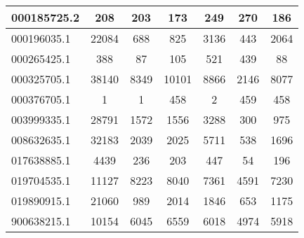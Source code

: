 \begin{adjustbox}{center}
\begin{tabular}{|l||c|c|c|c|c|c|}
\hline
000185725.2 & \cellcolor[RGB]{254, 250, 250} 208 & \cellcolor[RGB]{250, 250, 254} 203 & \cellcolor[RGB]{200, 200, 249} 173 & \cellcolor[RGB]{235, 71, 71} 249 & \cellcolor[RGB]{235, 71, 71} 270 & \cellcolor[RGB]{223, 223, 251} 186 \\
\hline
000196035.1 & \cellcolor[RGB]{235, 71, 71} 22084 & \cellcolor[RGB]{232, 232, 252} 688 & \cellcolor[RGB]{237, 237, 253} 825 & \cellcolor[RGB]{248, 195, 195} 3136 & \cellcolor[RGB]{223, 223, 251} 443 & \cellcolor[RGB]{252, 232, 232} 2064 \\
\hline
000265425.1 & \cellcolor[RGB]{252, 232, 232} 388 & \cellcolor[RGB]{232, 232, 252} 87 & \cellcolor[RGB]{232, 232, 252} 105 & \cellcolor[RGB]{250, 214, 214} 521 & \cellcolor[RGB]{251, 223, 223} 439 & \cellcolor[RGB]{232, 232, 252} 88 \\
\hline
000325705.1 & \cellcolor[RGB]{235, 71, 71} 38140 & \cellcolor[RGB]{241, 241, 253} 8349 & \cellcolor[RGB]{235, 71, 71} 10101 & \cellcolor[RGB]{253, 237, 237} 8866 & \cellcolor[RGB]{48, 48, 232} 2146 & \cellcolor[RGB]{227, 227, 252} 8077 \\
\hline
000376705.1 & \cellcolor[RGB]{232, 232, 252} 1 & \cellcolor[RGB]{232, 232, 252} 1 & \cellcolor[RGB]{252, 232, 232} 458 & \cellcolor[RGB]{232, 232, 252} 2 & \cellcolor[RGB]{252, 232, 232} 459 & \cellcolor[RGB]{252, 232, 232} 458 \\
\hline
003999335.1 & \cellcolor[RGB]{235, 71, 71} 28791 & \cellcolor[RGB]{255, 255, 255} 1572 & \cellcolor[RGB]{255, 255, 255} 1556 & \cellcolor[RGB]{235, 71, 71} 3288 & \cellcolor[RGB]{177, 177, 246} 300 & \cellcolor[RGB]{218, 218, 251} 975 \\
\hline
008632635.1 & \cellcolor[RGB]{235, 71, 71} 32183 & \cellcolor[RGB]{255, 255, 255} 2039 & \cellcolor[RGB]{255, 255, 255} 2025 & \cellcolor[RGB]{235, 71, 71} 5711 & \cellcolor[RGB]{48, 48, 232} 538 & \cellcolor[RGB]{218, 218, 251} 1696 \\
\hline
017638885.1 & \cellcolor[RGB]{235, 71, 71} 4439 & \cellcolor[RGB]{253, 237, 237} 236 & \cellcolor[RGB]{237, 237, 253} 203 & \cellcolor[RGB]{235, 71, 71} 447 & \cellcolor[RGB]{48, 48, 232} 54 & \cellcolor[RGB]{227, 227, 252} 196 \\
\hline
019704535.1 & \cellcolor[RGB]{235, 71, 71} 11127 & \cellcolor[RGB]{251, 223, 223} 8223 & \cellcolor[RGB]{253, 237, 237} 8040 & \cellcolor[RGB]{237, 237, 253} 7361 & \cellcolor[RGB]{48, 48, 232} 4591 & \cellcolor[RGB]{227, 227, 252} 7230 \\
\hline
019890915.1 & \cellcolor[RGB]{235, 71, 71} 21060 & \cellcolor[RGB]{227, 227, 252} 989 & \cellcolor[RGB]{252, 227, 227} 2014 & \cellcolor[RGB]{253, 237, 237} 1846 & \cellcolor[RGB]{214, 214, 250} 653 & \cellcolor[RGB]{237, 237, 253} 1175 \\
\hline
900638215.1 & \cellcolor[RGB]{235, 71, 71} 10154 & \cellcolor[RGB]{254, 250, 250} 6045 & \cellcolor[RGB]{235, 71, 71} 6559 & \cellcolor[RGB]{250, 250, 254} 6018 & \cellcolor[RGB]{48, 48, 232} 4974 & \cellcolor[RGB]{223, 223, 251} 5918 \\
\hline
\end{tabular}
\end{adjustbox}
